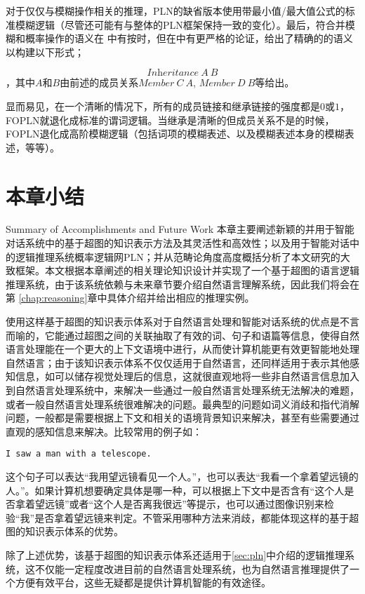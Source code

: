 对于仅仅与模糊操作相关的推理，PLN的缺省版本使用带最小值/最大值公式的标准模糊逻辑（尽管还可能有与整体的PLN框架保持一致的变化）。最后，符合并模糊和概率操作的语义在\cite{Goertzel2008} 中有按时，但在\cite{Goertzel2010e}中有更严格的论证，给出了精确的的语义以构建以下形式；

$$
\textit{Inheritance} \ A \  B
$$，其中$A$和$B$由前述的成员关系$\textit{Member}\ C\ A$, $\textit{Member}\ D\ B$等给出。

显而易见，在一个清晰的情况下，所有的成员链接和继承链接的强度都是$0$或$1$，FOPLN就退化成标准的谓词逻辑。当继承是清晰的但成员关系不是的时候，FOPLN退化成高阶模糊逻辑（包括词项的模糊表述、以及模糊表述本身的模糊表述，等等）。


\section{本章小结}{Summary of Accomplishments and Future Work}
本章主要阐述新颖的并用于智能对话系统中的基于超图的知识表示方法及其灵活性和高效性；以及用于智能对话中的逻辑推理系统概率逻辑网PLN；并从范畴论角度高度概括分析了本文研究的大致框架。本文根据本章阐述的相关理论知识设计并实现了一个基于超图的语言逻辑推理系统，由于该系统依赖与未来章节要介绍自然语言理解系统，因此我们将会在第 \ref{chap:reasoning}章中具体介绍并给出相应的推理实例。

使用这样基于超图的知识表示体系对于自然语言处理和智能对话系统的优点是不言而喻的，它能通过超图之间的关联抽取了有效的词、句子和语篇等信息，使得自然语言处理能在一个更大的上下文语境中进行，从而使计算机能更有效更智能地处理自然语言；由于该知识表示体系不仅仅适用于自然语言，还同样适用于表示其他感知信息，如可以储存视觉处理后的信息，这就很直观地将一些非自然语言信息加入到自然语言处理系统中，来解决一些通过一般自然语言处理系统无法解决的难题，或者一般自然语言处理系统很难解决的问题。最典型的问题如词义消歧和指代消解问题，一般都是需要根据上下文和相关的语境背景知识来解决，甚至有些需要通过直观的感知信息来解决。比较常用的例子如：

\begin{verbatim}
I saw a man with a telescope.
\end{verbatim}

这个句子可以表达“我用望远镜看见一个人。”，也可以表达“我看一个拿着望远镜的人。”。如果计算机想要确定具体是哪一种，可以根据上下文中是否含有“这个人是否拿着望远镜”或者“这个人是否离我很远”等提示，也可以通过图像识别来检验“我”是否拿着望远镜来判定。不管采用哪种方法来消歧，都能体现这样的基于超图的知识表示体系的优势。

除了上述优势，该基于超图的知识表示体系还适用于\ref{sec:pln}中介绍的逻辑推理系统，这不仅能一定程度改进目前的自然语言处理系统，也为自然语言推理提供了一个方便有效平台，这些无疑都是提供计算机智能的有效途径。
